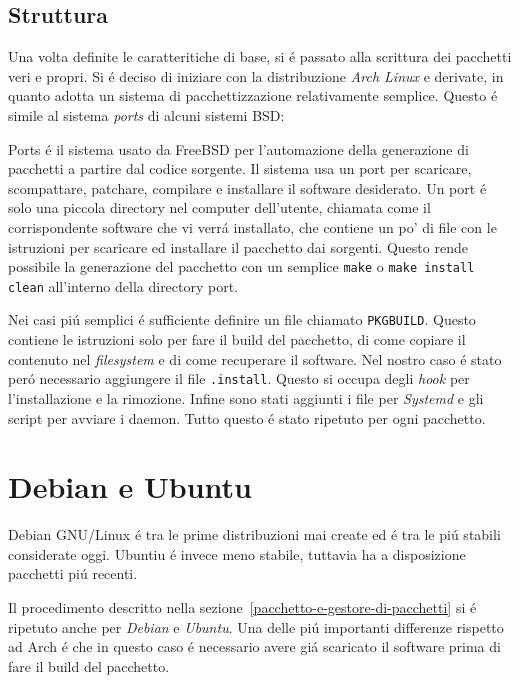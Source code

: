\documentclass[10pt,titlepage,twoside,a4paper]{report}
\begin{document}
\subsection{Struttura}
Una volta definite le caratteritiche di base, si \'e passato alla scrittura dei 
pacchetti veri e propri. Si \'e deciso di iniziare con la 
distribuzione \emph{Arch Linux} e derivate, in quanto adotta un sistema di 
pacchettizzazione relativamente semplice. Questo \'e simile al sistema 
\emph{ports} di alcuni sistemi BSD\cite{portsLikeSystem}:
\begin{displayquote}
Ports \'e il sistema usato da FreeBSD per l'automazione della generazione di 
pacchetti a partire dal codice sorgente. Il sistema usa un port per scaricare, 
scompattare, patchare, compilare e installare il software desiderato. Un port 
\'e solo una piccola directory nel computer dell'utente, chiamata come il 
corrispondente software che vi verr\'a installato, che contiene un po' di file 
con le istruzioni per scaricare ed installare il pacchetto dai sorgenti. Questo 
rende possibile la generazione del pacchetto con un semplice \texttt{make} o 
\texttt{make install clean} all'interno della directory port.
\end{displayquote}

Nei casi pi\'u semplici \'e sufficiente definire un file chiamato 
\texttt{PKGBUILD}. Questo contiene le istruzioni solo per fare il build del 
pacchetto, di come copiare il contenuto nel \emph{filesystem} e di come 
recuperare il software. Nel nostro caso \'e stato per\'o necessario aggiungere
il file \texttt{.install}. Questo si occupa degli \emph{hook} per 
l'installazione e la rimozione. Infine sono stati aggiunti i file per 
\emph{Systemd} e gli script per avviare i daemon. Tutto questo \'e stato 
ripetuto per ogni pacchetto.

\section{Debian e Ubuntu}
Debian GNU/Linux \'e tra le prime distribuzioni mai create ed \'e tra le pi\'u 
stabili considerate oggi. Ubuntiu \'e invece meno stabile, tuttavia ha a 
disposizione pacchetti pi\'u recenti. 

Il procedimento descritto nella sezione~\ref{pacchetto-e-gestore-di-pacchetti}
si \'e ripetuto anche per \emph{Debian} e \emph{Ubuntu}. Una delle pi\'u 
importanti differenze rispetto ad Arch \'e che in questo caso \'e necessario 
avere gi\'a scaricato il software prima di fare il build del pacchetto.
\end{document}
